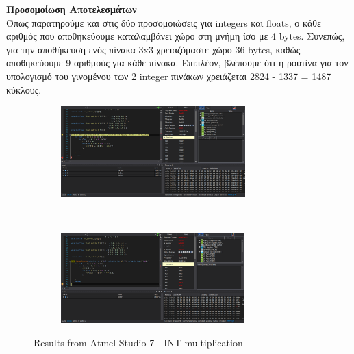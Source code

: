 \documentclass{article}
\begin{document}
	\pagebreak
	\noindent
	\textbf{Προσομοίωση Αποτελεσμάτων} \\
	
	\noindent
	Όπως παρατηρούμε και στις δύο προσομοιώσεις για integers και floats, ο κάθε αριθμός που αποθηκεύουμε καταλαμβάνει χώρο στη μνήμη ίσο με 4 bytes. Συνεπώς, για την αποθήκευση ενός πίνακα 3x3 χρειαζόμαστε χώρο 36 bytes, καθώς αποθηκεύουμε 9 αριθμούς για κάθε πίνακα.	Επιπλέον, βλέπουμε ότι η ρουτίνα για τον υπολογισμό του γινομένου των 2 integer πινάκων χρειάζεται 2824 - 1337 = 1487 κύκλους. \\
	\begin{figure}[h!]
		\centering
		\begin{subfigure}[t]{0.5\textwidth}
			\centering
			\includegraphics[height=3.5cm, width=\linewidth]{./results/lab10_sim_ints_a.png}
		\end{subfigure}%
		~
		\begin{subfigure}[t]{0.5\textwidth}
			\centering
			\includegraphics[height=3.5cm, width=\linewidth]{./results/lab10_sim_ints_b.png}
		\end{subfigure}
		\caption{Results from Αtmel Studio 7 - INT multiplication}
	\end{figure}
\end{document}
